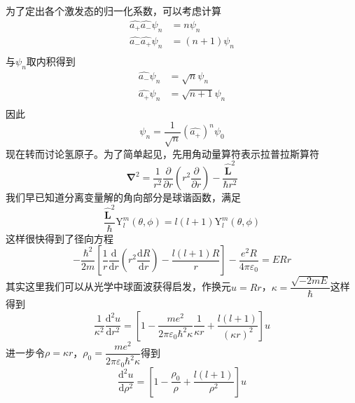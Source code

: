 \documentclass[12pt, a4paper, oneside]{ctexart}
\begin{document}
	\quad\quad 为了定出各个激发态的归一化系数，可以考虑计算
	\begin{align}
		\hat{a_{+}}\hat{a_{-}}\psi_{n}&=n\psi_{n}\\
		\hat{a_{-}}\hat{a_{+}}\psi_{n}&=(n+1)\psi_{n}\\
	\end{align}
	\quad\quad 与$\psi_{n}$取内积得到
	\begin{align}
		\hat{a_{-}}\psi_{n}&=\sqrt{n}\psi_{n}\\
		\hat{a_{+}}\psi_{n}&=\sqrt{n+1}\psi_{n}\\
	\end{align}
	\quad\quad 因此
	\begin{equation}
		\psi_{n}=\dfrac{1}{\sqrt{n}}\left(\hat{a_{+}}\right)^{n}\psi_{0}
	\end{equation}
	\quad\quad 现在转而讨论氢原子。为了简单起见，先用角动量算符表示拉普拉斯算符
	\begin{equation}
		\boldsymbol{\nabla}^{2}=\dfrac{1}{r^{2}}\dfrac{\partial}{\partial r}\left(r^{2}\dfrac{\partial}{\partial r}\right)-\dfrac{\boldsymbol{\hat{L}}^{2}}{\hbar r^{2}}
	\end{equation}
	\quad\quad 我们早已知道分离变量解的角向部分是球谐函数，满足
	\begin{equation}
		\dfrac{\boldsymbol{\hat{L}}^{2}}{\hbar}\mathrm{Y}_{l}^{m}(\theta,\phi)=l(l+1)\mathrm{Y}_{l}^{m}(\theta,\phi)
	\end{equation}
	\quad\quad 这样很快得到了径向方程
	\begin{equation}
		-\dfrac{\hbar^{2}}{2m}\left[\dfrac{1}{r}\dfrac{\mathrm{d}}{\mathrm{d}r}\left(r^{2}\dfrac{\mathrm{d}R}{\mathrm{d}r}\right)-\dfrac{l\left(l+1\right)R}{r}\right]-\dfrac{e^{2}R}{4\pi\varepsilon_{0}}=ERr
	\end{equation}
	\quad\quad 其实这里我们可以从光学中球面波获得启发，作换元$u=Rr$，$\kappa=\dfrac{\sqrt{-2mE}}{\hbar}$这样得到
	\begin{equation}
		\dfrac{1}{\kappa^{2}}\dfrac{\mathrm{d}^{2}u}{\mathrm{d}r^{2}}=\left[1-\dfrac{me^{2}}{2\pi\varepsilon_{0}\hbar^{2}\kappa}\dfrac{1}{\kappa r}+\dfrac{l\left(l+1\right)}{\left(\kappa r\right)^{2}}\right]u
	\end{equation}
	\quad\quad 进一步令$\rho=\kappa r$，$\rho_{0}=\dfrac{me^{2}}{2\pi\varepsilon_{0}\hbar^{2}\kappa}$得到
	\begin{equation}
		\dfrac{\mathrm{d}^{2}u}{\mathrm{d}\rho^{2}}=\left[1-\dfrac{\rho_{0}}{\rho}+\dfrac{l\left(l+1\right)}{\rho^{2}}\right]u
	\end{equation}
\end{document}
